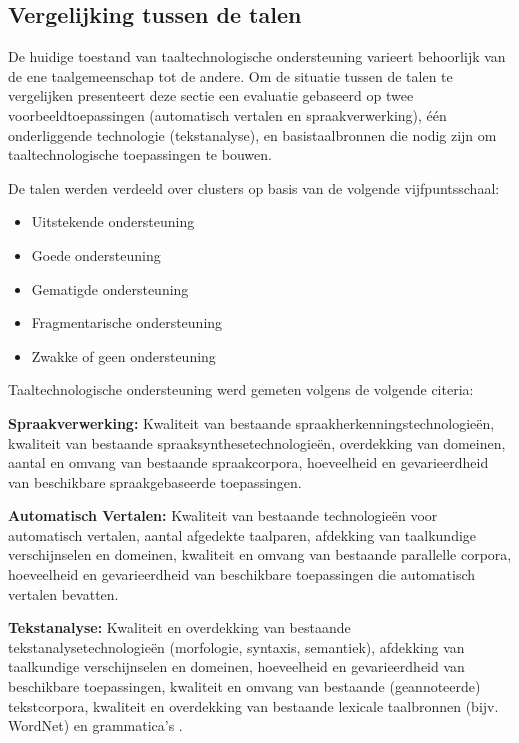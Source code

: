\begin{multicols}{2}
\subsection{Vergelijking tussen de talen}

De huidige toestand van taaltechnologische ondersteuning  varieert behoorlijk van de ene taalgemeenschap tot de andere. Om de situatie tussen de talen te vergelijken presenteert deze sectie een evaluatie gebaseerd op twee voorbeeldtoepassingen (automatisch vertalen en spraakverwerking), {\'e}{\'e}n onderliggende technologie (tekstanalyse), en basistaalbronnen die nodig zijn om taaltechnologische toepassingen te bouwen.

De talen werden verdeeld over clusters op basis van de volgende vijfpuntsschaal:

\begin{itemize}
\item Uitstekende ondersteuning
\item Goede ondersteuning
\item Gematigde ondersteuning
\item  Fragmentarische ondersteuning
\item Zwakke of geen ondersteuning
\end{itemize}

Taaltechnologische ondersteuning werd gemeten volgens de volgende citeria:

\textbf{Spraakverwerking:} Kwaliteit van bestaande spraakherkenningstechnologie{\"e}n, kwaliteit van bestaande spraaksynthesetechnologie{\"e}n, overdekking van domeinen, aantal en omvang van bestaande spraakcorpora, hoeveelheid en gevarieerdheid van beschikbare spraakgebaseerde toepassingen.

\textbf{Automatisch Vertalen:} Kwaliteit van bestaande technologie{\"e}n voor automatisch vertalen, aantal afgedekte taalparen, afdekking van taalkundige verschijnselen en domeinen, kwaliteit en omvang van bestaande parallelle corpora, hoeveelheid en gevarieerdheid van beschikbare  toepassingen die automatisch vertalen bevatten.

\textbf{Tekstanalyse:} Kwaliteit en overdekking van bestaande tekstanalysetechnologie{\"e}n (morfologie, syntaxis, semantiek), afdekking van taalkundige verschijnselen en domeinen, hoeveelheid en gevarieerdheid van beschikbare  toepassingen, kwaliteit en omvang van bestaande (geannoteerde) tekstcorpora, kwaliteit en overdekking van bestaande lexicale taalbronnen (bijv. WordNet) en grammatica's .


\end{multicols}
